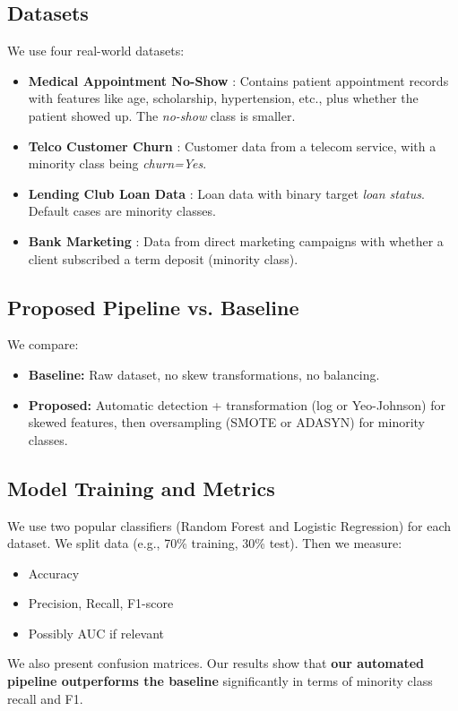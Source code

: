\documentclass[11pt]{article}
\begin{document}
\subsection{Datasets}
We use four real-world datasets:
\begin{itemize}
    \item \textbf{Medical Appointment No-Show} \cite{noshowlink}: Contains patient appointment records with features like age, scholarship, hypertension, etc., plus whether the patient showed up. The \textit{no-show} class is smaller.
    \item \textbf{Telco Customer Churn} \cite{telcolink}: Customer data from a telecom service, with a minority class being \textit{churn=Yes}.
    \item \textbf{Lending Club Loan Data} \cite{lendinglink}: Loan data with binary target \textit{loan status}. Default cases are minority classes.
    \item \textbf{Bank Marketing} \cite{bankmarketinglink}: Data from direct marketing campaigns with whether a client subscribed a term deposit (minority class).
\end{itemize}

\subsection{Proposed Pipeline vs. Baseline}
We compare:
\begin{itemize}
    \item \textbf{Baseline:} Raw dataset, no skew transformations, no balancing.
    \item \textbf{Proposed:} Automatic detection + transformation (log or Yeo-Johnson) for skewed features, then oversampling (SMOTE or ADASYN) for minority classes.
\end{itemize}

\subsection{Model Training and Metrics}
We use two popular classifiers (Random Forest and Logistic Regression) for each dataset. We split data (e.g., 70\% training, 30\% test). Then we measure:
\begin{itemize}
    \item Accuracy
    \item Precision, Recall, F1-score
    \item Possibly AUC if relevant
\end{itemize}
We also present confusion matrices. Our results show that \textbf{our automated pipeline outperforms the baseline} significantly in terms of minority class recall and F1.
\end{document}
